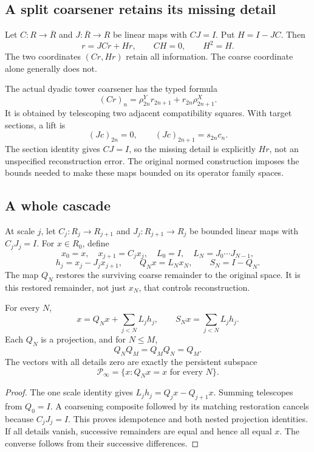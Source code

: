 \subsection{A split coarsener retains its missing detail}
Let \(C:R\to\overline R\) and \(J:\overline R\to R\) be linear maps with \(CJ=I\). Put \(H=I-JC\). Then
\[
 r=JCr+Hr,\qquad CH=0,\qquad H^2=H.
\]
The two coordinates \((Cr,Hr)\) retain all information. The coarse coordinate alone generally does not.

The actual dyadic tower coarsener has the typed formula
\begin{equation}\label{eq:dyadic}
 (Cr)_n=\rho^Y_{2n}r_{2n+1}+r_{2n}\rho^X_{2n+1}.
\end{equation}
It is obtained by telescoping two adjacent compatibility squares. With target sections, a lift is
\[
 (Jc)_{2n}=0,\qquad (Jc)_{2n+1}=s_{2n}c_n.
\]
The section identity gives \(CJ=I\), so the missing detail is explicitly \(Hr\), not an unspecified reconstruction error. The original normed construction imposes the bounds needed to make these maps bounded on its operator family spaces.

\subsection{A whole cascade}
At scale \(j\), let \(C_j:R_j\to R_{j+1}\) and \(J_j:R_{j+1}\to R_j\) be bounded linear maps with \(C_jJ_j=I\). For \(x\in R_0\), define
\[
 x_0=x,\quad x_{j+1}=C_jx_j,\quad
 L_0=I,\quad L_N=J_0\cdots J_{N-1},
\]
\[
 h_j=x_j-J_jx_{j+1},\qquad Q_Nx=L_Nx_N,
 \qquad S_N=I-Q_N.
\]
The map \(Q_N\) restores the surviving coarse remainder to the original space. It is this restored remainder, not just \(x_N\), that controls reconstruction.

\begin{theorem}\label{KS26}
For every \(N\),
\[
 x=Q_Nx+\sum_{j<N}L_jh_j,
 \qquad S_Nx=\sum_{j<N}L_jh_j.
\]
Each \(Q_N\) is a projection, and for \(N\le M\),
\[
 Q_NQ_M=Q_MQ_N=Q_M.
\]
The vectors with all details zero are exactly the persistent subspace
\[
 \mathcal P_\infty=\{x:Q_Nx=x\text{ for every }N\}.
\]
\end{theorem}
\begin{proof}
The one scale identity gives \(L_jh_j=Q_jx-Q_{j+1}x\). Summing telescopes from \(Q_0=I\). A coarsening composite followed by its matching restoration cancels because \(C_jJ_j=I\). This proves idempotence and both nested projection identities. If all details vanish, successive remainders are equal and hence all equal \(x\). The converse follows from their successive differences.
\end{proof}

